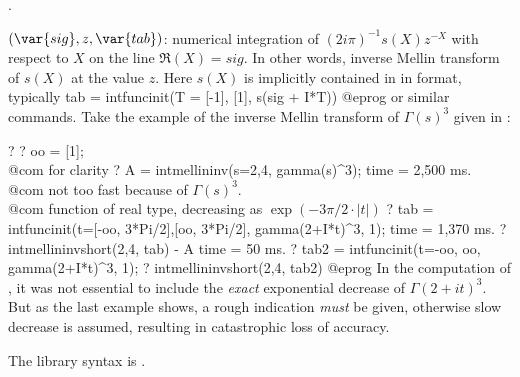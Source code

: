 .

$(\var{sig},z,\var{tab})$: \label{se:intmellininvshort}numerical integration
of $(2i\pi)^{-1}s(X)z^{-X}$ with respect to $X$ on the line $\Re(X)=sig$.
In other words, inverse Mellin transform of $s(X)$ at the value $z$.
Here $s(X)$ is implicitly contained in  in  format,
typically
\bprog
tab = intfuncinit(T = [-1], [1], s(sig + I*T))
@eprog\noindent
or similar commands. Take the example of the inverse Mellin transform of
$\Gamma(s)^3$ given in :

\bprog
? 
? oo = [1]; \\@com for clarity
? A = intmellininv(s=2,4, gamma(s)^3);
time = 2,500 ms. \\@com not too fast because of $\Gamma(s)^3$.
\\ @com function of real type, decreasing as $\exp(-3\pi/2\cdot |t|)$
? tab = intfuncinit(t=[-oo, 3*Pi/2],[oo, 3*Pi/2], gamma(2+I*t)^3, 1);
time = 1,370 ms.
? intmellininvshort(2,4, tab) - A
time = 50 ms.
? tab2 = intfuncinit(t=-oo, oo, gamma(2+I*t)^3, 1);
? intmellininvshort(2,4, tab2)
@eprog\noindent
In the computation of , it was not essential to include the
\emph{exact} exponential decrease of $\Gamma(2+it)^3$. But as the last
example shows, a rough indication \emph{must} be given, otherwise slow
decrease is assumed, resulting in catastrophic loss of accuracy.

The library syntax is .

